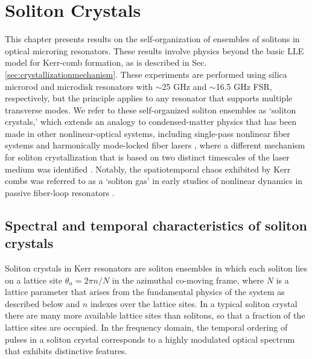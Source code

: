  \chapter{Soliton Crystals} \label{ch:SolitonCrystals}

This chapter presents results on the self-organization of ensembles of solitons in optical microring resonators. These results involve physics beyond the basic LLE model for Kerr-comb formation, as is described in Sec. \ref{sec:crystallizationmechanism}. These experiments are performed using silica microrod \cite{DelHaye2013} and microdisk \cite{Lee2012} resonators with $\sim$25 GHz and $\sim$16.5 GHz FSR, respectively, but the principle applies to any resonator that supports multiple transverse modes. We refer to these self-organized soliton ensembles as `soliton crystals,' which extends an analogy to condensed-matter physics that has been made in other nonlinear-optical systems, including single-pass nonlinear fiber systems \cite{Zajnulina2017} and harmonically mode-locked fiber lasers \cite{Haboucha2008,Amrani2011a}, where a different mechanism for soliton crystallization that is based on two distinct timescales of the laser medium was identified \cite{Haboucha2008c}. Notably, the spatiotemporal chaos exhibited by Kerr combs was referred to as a `soliton gas' in early studies of nonlinear dynamics in passive fiber-loop resonators \cite{Malomed1998,Mitschke1998,Schwache1997}. 

\section{Spectral and temporal characteristics of soliton crystals}

Soliton crystals in Kerr resonators are soliton ensembles in which each soliton lies on a lattice site $\theta_n= 2\pi n/N$ in the azimuthal co-moving frame, where $N$ is a lattice parameter that arises from the fundamental physics of the system as described below and $n$ indexes over the lattice sites. In a typical soliton crystal there are many more available lattice sites than solitons, so that a fraction of the lattice sites are occupied. In the frequency domain, the temporal ordering of pulses in a soliton crystal corresponds to a highly modulated optical spectrum that exhibits distinctive features. 

